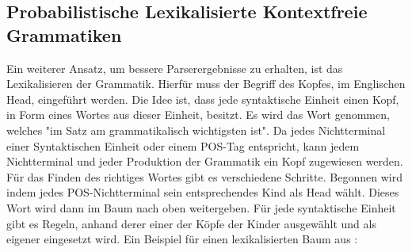 \subsection{Probabilistische Lexikalisierte Kontextfreie Grammatiken}
\label{sec:nlp:stat-parsen:plcfg}

Ein weiterer Ansatz, um bessere Parserergebnisse zu erhalten, ist das Lexikalisieren der Grammatik. Hierfür muss der Begriff des Kopfes, im Englischen Head, eingeführt werden. Die Idee ist, dass jede syntaktische Einheit einen Kopf, in Form eines Wortes aus dieser Einheit, besitzt. Es wird das Wort genommen, welches "im Satz am grammatikalisch wichtigsten ist". %
Da jedes Nichtterminal einer Syntaktischen Einheit oder einem POS-Tag entspricht, kann jedem Nichtterminal und jeder Produktion der Grammatik ein Kopf zugewiesen werden. Für das Finden des richtiges Wortes gibt es verschiedene Schritte. Begonnen wird indem jedes POS-Nichtterminal sein entsprechendes Kind als Head wählt. Dieses Wort wird dann im Baum nach oben weitergeben. Für jede syntaktische Einheit gibt es Regeln, anhand derer einer der Köpfe der Kinder ausgewählt und als eigener eingesetzt wird. Ein Beispiel für einen lexikalisierten Baum aus %
:\\

